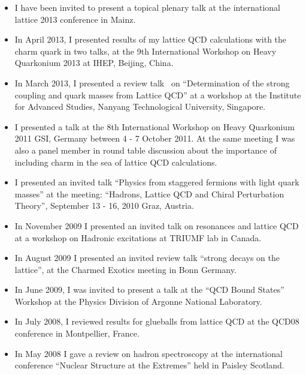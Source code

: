\documentclass[12pt]{article}
\begin{document}
\begin{itemize}

\item I have been invited to present a topical plenary
      talk at the international lattice 2013 conference
      in Mainz.

\item In April 2013, I presented results of my lattice
      QCD calculations with the charm quark in two talks, at 
the 9th International Workshop on Heavy Quarkonium 2013 
at IHEP, Beijing, China.

\item In March 2013, I presented a 
review talk~\cite{McNeile:2013rga} on 
``Determination of the strong coupling and quark 
masses from Lattice QCD'' at a workshop
at the Institute for Advanced Studies, Nanyang Technological
University, Singapore.


\item I presented a talk at the 
8th International Workshop on Heavy Quarkonium 2011 
GSI, Germany between 4 - 7 October 2011. At the same meeting I
was also a panel member in round table discussion about the
importance of including charm in the sea of lattice QCD calculations.

\item I presented an invited talk 
   ``Physics from staggered fermions with light quark masses''
at the meeting:
``Hadrons, Lattice QCD and Chiral Perturbation Theory'',
September 13 - 16, 2010 Graz, Austria.

\item In November 2009 I presented an invited talk
      on resonances and lattice QCD at a
      workshop on Hadronic excitations at TRIUMF lab in Canada.

\item In August 2009 I presented an invited review talk
      ``strong decays on the lattice'',
       at the Charmed Exotics meeting in Bonn Germany.


\item In June 2009, I was invited to present a talk at 
      the ``QCD Bound States'' Workshop at
the Physics Division of Argonne National Laboratory.


\item In July 2008, I reviewed results 
      for glueballs from lattice QCD at the QCD08 conference
      in Montpellier, France.

\item In May 2008 I gave a review on
hadron spectroscopy at the international conference 
``Nuclear Structure at the Extremes'' held in Paisley Scotland.


\end{itemize}
\end{document}
